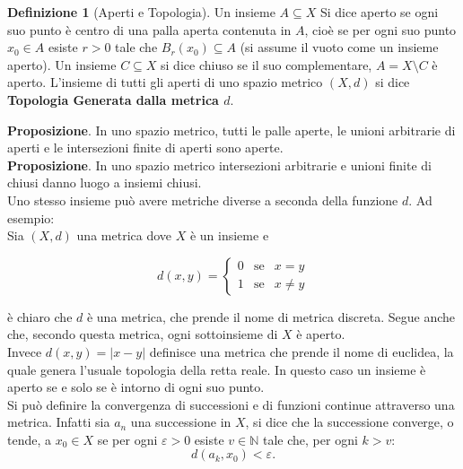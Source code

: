 \documentclass[a4paper,twoside]{article}
\renewcommand{\epsilon}{\varepsilon}
\newcommand{\N}{\mathbb{N}}
\theoremstyle{definition}
\newtheorem{definizione}[theorem]{Definizione}
\numberwithin{theorem}{section}
\begin{document}
\begin{definizione}[Aperti e Topologia]
Un insieme $A\subseteq X$ Si dice aperto se ogni suo punto è centro di una palla aperta contenuta in $A$, cioè se per ogni suo punto $x_0\in A$ esiste $r>0$ tale che $B_r(x_0)\subseteq A$ (si assume il vuoto come un insieme aperto). Un insieme $C\subseteq X$ si dice chiuso se il suo complementare, $A=X\setminus C$ è aperto. L'insieme di tutti gli aperti di uno spazio metrico $(X,d)$ si dice \textbf{Topologia Generata dalla metrica $d$}.
\end{definizione}

\textbf{Proposizione}. In uno spazio metrico, tutti le palle aperte, le unioni arbitrarie di aperti e le intersezioni finite di aperti sono aperte.\\
\textbf{Proposizione}. In uno spazio metrico intersezioni arbitrarie e unioni finite di chiusi danno luogo a insiemi chiusi.\\

Uno stesso insieme può avere metriche diverse a seconda della funzione $d$. Ad esempio: \\
Sia $(X,d)$ una metrica dove $X$ è un insieme e

$$ d(x,y)=\left\{\begin{array}{ccl} 0 &\text{se} & x=y\\ 1 &\text{se} & x\neq y\end{array}\right. $$

è chiaro che $d$ è una metrica, che prende il nome di metrica discreta. Segue anche che, secondo questa metrica, ogni sottoinsieme di $X$ è aperto.\\
Invece $d(x,y)=|x-y|$ definisce una metrica che prende il nome di euclidea, la quale genera l'usuale topologia della retta reale. In questo caso un insieme è aperto se e solo se è intorno di ogni suo punto.\\
Si può definire la convergenza di successioni e di funzioni continue attraverso una metrica. Infatti sia $a_n$ una successione in $X$, si dice che la successione converge, o tende, a $x_0\in X$ se per ogni $\epsilon>0$ esiste $v\in \N$ tale che, per ogni $k>v$: \\
$$d(a_k,x_0)<\epsilon.$$
\end{document}
